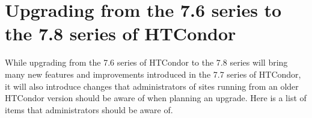 \section{Upgrading from the 7.6 series to the 7.8 series of HTCondor}\label{sec:gotchas}

While upgrading from the 7.6 series of HTCondor to the 7.8 series will bring many
new features and improvements introduced in the 7.7 series of HTCondor, it will
also introduce changes that administrators of sites running from an older
HTCondor version should be aware of when planning an upgrade.  Here is a list of
items that administrators should be aware of.

